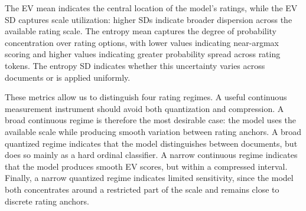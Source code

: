 
The EV mean indicates the central location of the model's ratings, while the EV SD captures scale utilization: higher SDs indicate broader dispersion across the available rating scale. The entropy mean captures the degree of probability concentration over rating options, with lower values indicating near-argmax scoring and higher values indicating greater probability spread across rating tokens. The entropy SD indicates whether this uncertainty varies across documents or is applied uniformly.

These metrics allow us to distinguish four rating regimes. A useful continuous measurement instrument should avoid both quantization and compression. A broad continuous regime is therefore the most desirable case: the model uses the available scale while producing smooth variation between rating anchors. A broad quantized regime indicates that the model distinguishes between documents, but does so mainly as a hard ordinal classifier. A narrow continuous regime indicates that the model produces smooth EV scores, but within a compressed interval. Finally, a narrow quantized regime indicates limited sensitivity, since the model both concentrates around a restricted part of the scale and remains close to discrete rating anchors.








